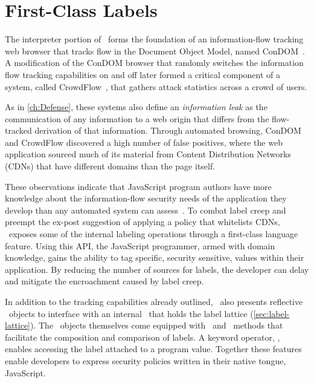 
\chapter{First-Class Labels}
\label{ch:first-class-labels}

The interpreter portion of \JitFlow\ forms the foundation of an information-flow tracking web browser that tracks flow in the Document Object Model, named ConDOM~\cite{kerschbaumer.etal+12}.
A modification of the ConDOM browser that randomly switches the information flow tracking capabilities on and off later formed a critical component of a system, called CrowdFlow~\cite{kerschbaumer.etal+13}, that gathers attack statistics across a crowd of users.

As in \autoref{ch:Defense}, these systems also define an \emph{information leak} as the communication of any information to a web origin that differs from the flow-tracked derivation of that information.
Through automated browsing, ConDOM and CrowdFlow discovered a high number of false positives, where the web application sourced much of its material from Content Distribution Networks (CDNs) that have different domains than the page itself.

These observations indicate that JavaScript program authors have more knowledge about the information-flow security needs of the application they develop than any automated system can assess~\cite{hennigan.etal+12, hennigan.etal+13}.
To combat label creep and preempt the ex-post suggestion of applying a policy that whitelists CDNs, \JitFlow\ exposes some of the internal labeling operations through a first-class language feature.
Using this API, the JavaScript programmer, armed with domain knowledge, gains the ability to tag specific, security sensitive, values within their application.
By reducing the number of sources for labels, the developer can delay and mitigate the encroachment caused by label creep.

In addition to the tracking capabilities already outlined, \JitFlow\ also presents reflective \FlowLabel\ objects to interface with an internal \FlowLabelRegistry\ that holds the label lattice (\autoref{sec:label-lattice}).
The \FlowLabel\ objects themselves come equipped with \mjoin\ and \msubsumes\ methods that facilitate the composition and comparison of labels.
A keyword operator, \mlabelof, enables accessing the label attached to a program value.
Together these features enable developers to express security policies written in their native tongue, JavaScript.

